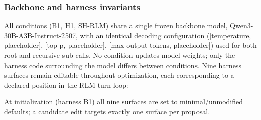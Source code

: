 \documentclass{article}
\begin{document}
\subsubsection{Backbone and harness invariants}
All conditions (B1, H1, SH-RLM) share a single frozen backbone model, Qwen3-30B-A3B-Instruct-2507, with an identical decoding configuration ([temperature, placeholder], [top-p, placeholder], [max output tokens, placeholder]) used for both root and recursive sub-calls. No condition updates model weights; only the harness code surrounding the model differs between conditions.
Nine harness surfaces remain editable throughout optimization, each corresponding to a declared position in the RLM turn loop:


At initialization (harness B1) all nine surfaces are set to minimal/unmodified defaults; a candidate edit targets exactly one surface per proposal.
\end{document}
